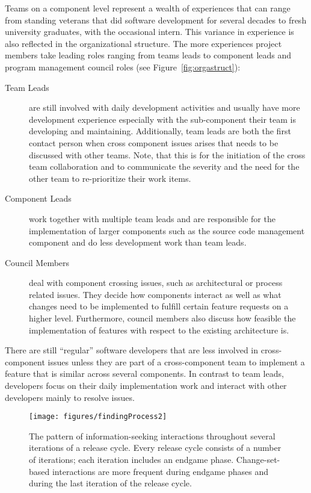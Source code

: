 Teams on a component level represent a wealth of experiences that can range from standing veterans that did software development for several decades to fresh university graduates, with the occasional intern.
This variance in experience is also reflected in the organizational structure.
The more experiences project members take leading roles ranging from teams leads to component leads and program management council roles (see Figure~\ref{fig:orgastruct}):
\begin{description}
\item[Team Leads] are still involved with daily development activities and usually have more development experience especially with the sub-component their team is developing and maintaining.
Additionally, team leads are both the first contact person when cross component issues arises that needs to be discussed with other teams.
Note, that this is for the initiation of the cross team collaboration and to communicate the severity and the need for the other team to re-prioritize their work items.
\item[Component Leads] work together with multiple team leads and are responsible for the implementation of larger components such as the source code management component and do less development work than team leads.
\item[Council Members] deal with component crossing issues, such as architectural or process related issues.
They decide how components interact as well as what changes need to be implemented to fulfill certain feature requests on a higher level.
Furthermore, council members also discuss how feasible the implementation of features with respect to the existing architecture is.
\end{description}
There are still ``regular'' software developers that are less involved in cross-component issues unless they are part of a cross-component team to implement a feature that is similar across several components.
In contrast to team leads, developers focus on their daily implementation work and interact with other developers mainly to resolve issues.

\begin{figure}[t]
\centering
\texttt{[image: figures/findingProcess2]}
\vspace{-20pt}\caption{The pattern of information-seeking interactions throughout several iterations of a release cycle. Every release cycle consists of a number of iterations; each iteration includes an endgame phase. Change-set-based interactions are more frequent during endgame phases and during the last iteration of the release cycle.}
\label{IterationsFig1}
\end{figure}

